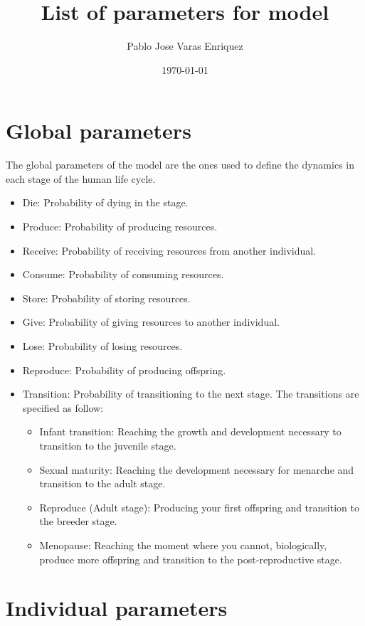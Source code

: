\documentclass{article}
\title{List of parameters for model}
\author{Pablo Jose Varas Enriquez}
\date{\today}
\begin{document}
\maketitle

\section{Global parameters}

The global parameters of the model are the ones used to define the dynamics in each stage of the human life cycle.

\begin{itemize}
    \item Die: Probability of dying in the stage.
    \item Produce: Probability of producing resources.
    \item Receive: Probability of receiving resources from another individual.
    \item Consume: Probability of consuming resources.
    \item Store: Probability of storing resources.
    \item Give: Probability of giving resources to another individual.
    \item Lose: Probability of losing resources.
    \item Reproduce: Probability of producing offspring.
    \item Transition: Probability of transitioning to the next stage. The transitions are specified as follow:
    \begin{itemize}
        \item Infant transition: Reaching the growth and development necessary to transition to the juvenile stage.
        \item Sexual maturity: Reaching the development necessary for menarche and transition to the adult stage.
        \item Reproduce (Adult stage): Producing your first offspring and transition to the breeder stage.
        \item Menopause: Reaching the moment where you cannot, biologically, produce more offspring and transition to the post-reproductive stage.
    \end{itemize}
\end{itemize}

\goodbreak

\section{Individual parameters}
\end{document}
